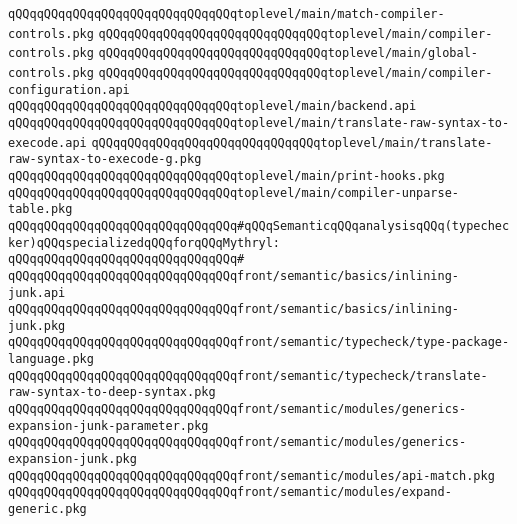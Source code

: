 \verb|qQQqqQQqqQQqqQQqqQQqqQQqqQQqqQQqtoplevel/main/match-compiler-controls.pkg|\newline
\verb|qQQqqQQqqQQqqQQqqQQqqQQqqQQqqQQqtoplevel/main/compiler-controls.pkg|\newline
\verb|qQQqqQQqqQQqqQQqqQQqqQQqqQQqqQQqtoplevel/main/global-controls.pkg|\newline
\verb|qQQqqQQqqQQqqQQqqQQqqQQqqQQqqQQqtoplevel/main/compiler-configuration.api|\newline
\verb|qQQqqQQqqQQqqQQqqQQqqQQqqQQqqQQqtoplevel/main/backend.api|\newline
\verb|qQQqqQQqqQQqqQQqqQQqqQQqqQQqqQQqtoplevel/main/translate-raw-syntax-to-execode.api|\newline
\verb|qQQqqQQqqQQqqQQqqQQqqQQqqQQqqQQqtoplevel/main/translate-raw-syntax-to-execode-g.pkg|\newline
\verb|qQQqqQQqqQQqqQQqqQQqqQQqqQQqqQQqtoplevel/main/print-hooks.pkg|\newline
\verb|qQQqqQQqqQQqqQQqqQQqqQQqqQQqqQQqtoplevel/main/compiler-unparse-table.pkg|\newline
\newline
\verb|qQQqqQQqqQQqqQQqqQQqqQQqqQQqqQQq#qQQqSemanticqQQqanalysisqQQq(typechecker)qQQqspecializedqQQqforqQQqMythryl:|\newline
\verb|qQQqqQQqqQQqqQQqqQQqqQQqqQQqqQQq#|\newline
\verb|qQQqqQQqqQQqqQQqqQQqqQQqqQQqqQQqfront/semantic/basics/inlining-junk.api|\newline
\verb|qQQqqQQqqQQqqQQqqQQqqQQqqQQqqQQqfront/semantic/basics/inlining-junk.pkg|\newline
\newline
\verb|qQQqqQQqqQQqqQQqqQQqqQQqqQQqqQQqfront/semantic/typecheck/type-package-language.pkg|\newline
\verb|qQQqqQQqqQQqqQQqqQQqqQQqqQQqqQQqfront/semantic/typecheck/translate-raw-syntax-to-deep-syntax.pkg|\newline
\newline
\verb|qQQqqQQqqQQqqQQqqQQqqQQqqQQqqQQqfront/semantic/modules/generics-expansion-junk-parameter.pkg|\newline
\verb|qQQqqQQqqQQqqQQqqQQqqQQqqQQqqQQqfront/semantic/modules/generics-expansion-junk.pkg|\newline
\verb|qQQqqQQqqQQqqQQqqQQqqQQqqQQqqQQqfront/semantic/modules/api-match.pkg|\newline
\verb|qQQqqQQqqQQqqQQqqQQqqQQqqQQqqQQqfront/semantic/modules/expand-generic.pkg|\newline

